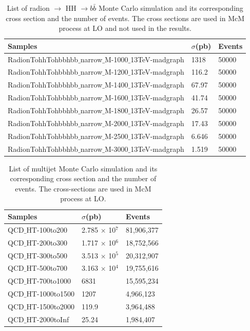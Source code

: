 \begin{table}[h!]
  \begin{center}
    \begin{tabular}{l|l|l}
    Samples & $\sigma$(pb) & Events \\
    \hline
    RadionTohhTohbbhbb$\_$narrow$\_$M-1000$\_$13TeV-madgraph & 1318 & 50000 \\
    RadionTohhTohbbhbb$\_$narrow$\_$M-1200$\_$13TeV-madgraph & 116.2 & 50000 \\
    RadionTohhTohbbhbb$\_$narrow$\_$M-1400$\_$13TeV-madgraph & 67.97 & 50000 \\
    RadionTohhTohbbhbb$\_$narrow$\_$M-1600$\_$13TeV-madgraph & 41.74 & 50000 \\
    RadionTohhTohbbhbb$\_$narrow$\_$M-1800$\_$13TeV-madgraph & 26.57 & 50000 \\
    RadionTohhTohbbhbb$\_$narrow$\_$M-2000$\_$13TeV-madgraph & 17.43 & 50000 \\
    RadionTohhTohbbhbb$\_$narrow$\_$M-2500$\_$13TeV-madgraph & 6.646 & 50000 \\
    RadionTohhTohbbhbb$\_$narrow$\_$M-3000$\_$13TeV-madgraph & 1.519 & 50000 \\
   \hline
    \end{tabular}
  \end{center}
  \caption{List of radion $\rightarrow$ HH $\rightarrow b\bar{b} $ Monte Carlo simulation and its corresponding cross section and the number of events. The cross sections are used in McM process at LO and not used in the results.}
\end{table} 

\begin{table}[h!]
  \begin{center}
    \begin{tabular}{l|l|l}
    Samples & $\sigma$(pb) & Events \\
    \hline
    QCD$\_$HT-100to200  & 2.785 $\times$ 10$^7$ & 81,906,377 \\
    QCD$\_$HT-200to300  & 1.717 $\times$ 10$^6$ & 18,752,566 \\
    QCD$\_$HT-300to500  & 3.513 $\times$ 10$^5$ & 20,312,907 \\
    QCD$\_$HT-500to700  & 3.163 $\times$ 10$^4$ & 19,755,616 \\
    QCD$\_$HT-700to1000  & 6831 & 15,595,234 \\
    QCD$\_$HT-1000to1500  & 1207 & 4,966,123 \\
    QCD$\_$HT-1500to2000  & 119.9 & 3,964,488 \\
    QCD$\_$HT-2000toInf  & 25.24 & 1,984,407 \\
	\hline
    \end{tabular}
  \end{center}

  \caption{List of multijet Monte Carlo simulation and its corresponding cross section and the number of events. The cross-sections are used in McM process at LO.}
\end{table}

